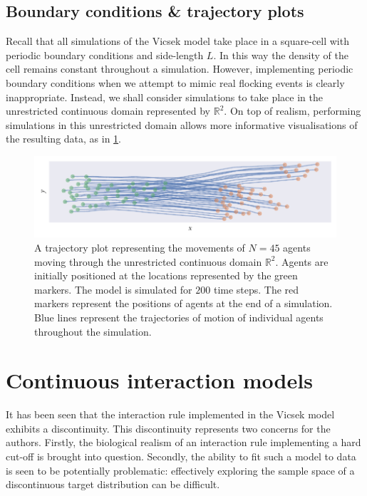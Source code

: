 \subsection{Boundary conditions \& trajectory plots}

Recall that all simulations of the Vicsek model take place in a square-cell with periodic
boundary conditions and side-length $L$. In this way the density of the cell remains
constant throughout a simulation. However, implementing periodic boundary conditions when
we attempt to mimic real flocking events is clearly inappropriate. Instead, we shall
consider simulations to take place in the unrestricted continuous domain represented by
$\mathbb{R}^2$.  On top of realism, performing simulations in this unrestricted domain
allows more informative visualisations of the resulting data, as in
\cref{fig:example_traj}.
\begin{figure}[tb]
    \includegraphics{example_traj_plot.pdf}
    \caption{A trajectory plot representing the movements of $N=45$ agents moving through
        the unrestricted continuous domain $\mathbb{R}^2$. Agents are initially positioned
        at the locations represented by the green markers. The model is simulated for
        $200$ time steps. The red markers represent the positions of agents at the end of
        a simulation. Blue lines represent the trajectories of motion of individual agents
        throughout the simulation.}
    \label{fig:example_traj}
\end{figure}

\section{Continuous interaction models}

It has been seen that the interaction rule implemented in the Vicsek model exhibits a
discontinuity. This discontinuity represents two concerns for the authors. Firstly, the
biological realism of an interaction rule implementing a hard cut-off is brought into
question. Secondly, the ability to fit such a model to data is seen to be potentially
problematic: effectively exploring the sample space of a discontinuous target
distribution can be difficult.

